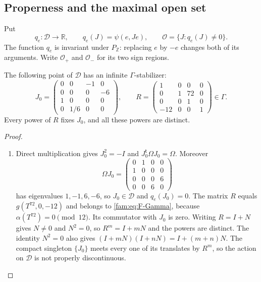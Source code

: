 \subsection{Properness and the maximal open set}\hypertarget{tag-01PX}{}\label{fam:section:F.2}

\begin{definition}\hypertarget{tag-IP02}{}\label{I:def:period-sign-domains}
Put
\[
 q_e:\mathcal D\longrightarrow\mathbb R,\qquad q_e(J)=\psi(e,Je),
 \qquad\mathcal O=\{J:q_e(J)\ne0\}.
\]
The function $q_e$ is invariant under $P_{\mathbb Z}$: replacing $e$ by
$-e$ changes both of its arguments.  Write $\mathcal O_+$ and
$\mathcal O_-$ for its two sign regions.
\end{definition}

\begin{proposition}\hypertarget{tag-01RB}{}\label{fam:src:F.2.1}\label{fam:st:F.2.1}

The following point of $\mathcal D$ has an infinite $\Gamma$-stabilizer:
\[
 J_0=\begin{pmatrix}
 0&0&-1&0\\0&0&0&-6\\1&0&0&0\\0&1/6&0&0
 \end{pmatrix},\qquad
 R=\begin{pmatrix}
 1&0&0&0\\0&1&72&0\\0&0&1&0\\-12&0&0&1
 \end{pmatrix}\in\Gamma.
\]
Every power of $R$ fixes $J_0$, and all these powers are distinct.
\end{proposition}



\begin{proof}
\begin{enumerate}[label=\arabic*.,leftmargin=*]
\item Direct multiplication gives $J_0^2=-I$ and
$J_0^{\mathsf t}\Omega J_0=\Omega$.  Moreover
\[
 \Omega J_0=\begin{pmatrix}
 0&1&0&0\\1&0&0&0\\0&0&0&6\\0&0&6&0
 \end{pmatrix}
\]
has eigenvalues $1,-1,6,-6$, so $J_0\in\mathcal D$ and $q_e(J_0)=0$.
The matrix $R$ equals $g(T^{72},0,-12)$ and belongs to \eqref{fam:eq:F-Gamma},
because $\alpha(T^{72})=0\pmod{12}$.  Its commutator with $J_0$ is zero.
Writing $R=I+N$ gives $N\ne0$ and $N^2=0$, so $R^m=I+mN$ and the
powers are distinct.  The identity $N^2=0$ also gives
\((I+mN)(I+nN)=I+(m+n)N\). The compact singleton $\{J_0\}$ meets every one of its translates by
$R^m$, so the action on $\mathcal D$ is not properly discontinuous.
\end{enumerate}
\end{proof}

